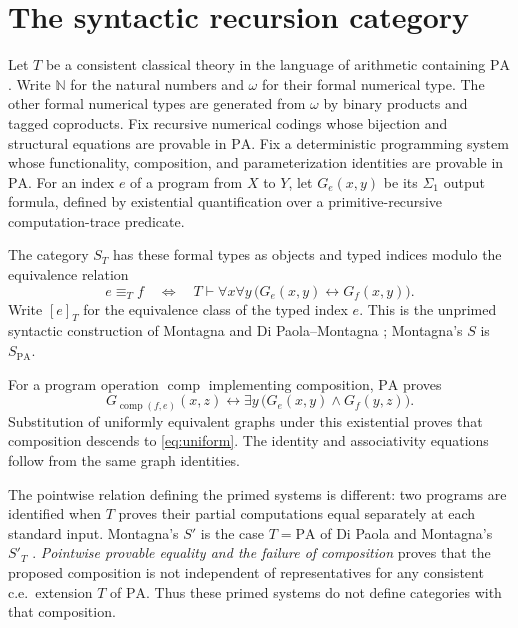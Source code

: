 \documentclass[11pt]{article}
\newcommand{\N}{\mathbb N}
\newcommand{\PA}{\mathrm{PA}}
\begin{document}
\section{The syntactic recursion category}\label{sec:syntactic}

Let $T$ be a consistent classical theory in the language of arithmetic
containing $\PA$. Write $\N$ for the natural numbers and $\omega$
for their formal numerical type. The other formal numerical types are
generated from $\omega$ by binary products and tagged coproducts.
Fix recursive numerical codings
whose bijection and structural equations are provable in $\PA$.
Fix a deterministic programming system whose functionality, composition,
and parameterization identities are provable in $\PA$.
For an index $e$ of a program from $X$ to $Y$, let $G_e(x,y)$ be its
$\Sigma_1$ output formula, defined by existential quantification over
a primitive-recursive computation-trace predicate.

The category $S_T$ has these formal types as objects and typed indices
modulo the equivalence relation
\begin{equation}\label{eq:uniform}
 e\equiv_T f
 \quad\Longleftrightarrow\quad
 T\vdash \forall x\forall y\,
       \bigl(G_e(x,y)\leftrightarrow G_f(x,y)\bigr).
\end{equation}
Write $[e]_T$ for the equivalence class of the typed index $e$.
This is the unprimed syntactic construction of Montagna and
Di Paola--Montagna \cite{Montagna,DPM}; Montagna's $S$ is $S_{\PA}$.

For a program operation $\operatorname{comp}$ implementing composition,
$\PA$ proves
\begin{equation}\label{eq:composition}
 G_{\operatorname{comp}(f,e)}(x,z)
 \leftrightarrow
 \exists y\,\bigl(G_e(x,y)\land G_f(y,z)\bigr).
\end{equation}
Substitution of uniformly equivalent graphs under this existential proves
that composition descends to \eqref{eq:uniform}. The identity and
associativity equations follow from the same graph identities.

The pointwise relation defining the primed systems is different:
two programs are identified when $T$ proves their partial computations
equal separately at each standard input. Montagna's $S'$ is the case
$T=\PA$ of Di Paola and Montagna's $S'_T$ \cite{Montagna,DPM}.
\emph{Pointwise provable equality and the failure of composition}
\cite[Corollary 2]{Composition} proves that the proposed composition
is not independent of representatives for any consistent c.e.\
extension $T$ of $\PA$. Thus these primed systems do not define
categories with that composition.
\end{document}
